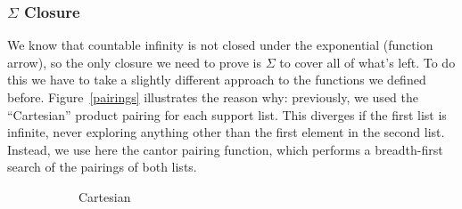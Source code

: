 \begin{refsection}
\subsubsection{\(\Sigma\) Closure}
We know that countable infinity is not closed under the exponential (function
arrow), so the only closure we need to prove is \(\Sigma\) to cover all of
what's left.
To do this we have to take a slightly different approach to the functions we
defined before.
Figure~\ref{pairings} illustrates the reason why: previously, we used the
``Cartesian'' product pairing for each support list.
This diverges if the first list is infinite, never exploring anything other than
the first element in the second list.
Instead, we use here the cantor pairing function, which performs a breadth-first
search of the pairings of both lists.
\begin{figure}
  \centering
  \begin{subfigure}[b]{.5\linewidth}
    \caption{Cartesian}
    \label{cartesian}
  \end{subfigure}%
  \begin{subfigure}[b]{.5\linewidth}
\end{subfigure}
\end{figure}
\end{refsection}
